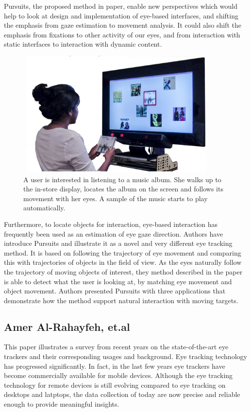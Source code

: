 Pursuits, the proposed method in paper, enable new perspectives which would help to look at design and implementation of eye-based interfaces, and shifting the emphasis from gaze estimation to movement analysis. It could also shift the emphasis from fixations to other activity of our eyes, and from interaction with static interfaces to interaction with dynamic content.\\

\begin{figure}[!hbt]
  \centering
  \includegraphics[width=4in,height=2.5in]{melodie2.png}
  \caption{A user is interested in listening to a music album. She walks up to the in-store display, locates the album on the screen and follows its movement with her eyes. A sample of the music starts to play automatically.}
  \label{melodie2}
\end{figure}

Furthermore, to locate objects for interaction, eye-based interaction has frequently been used as an estimation of eye gaze direction. Authors have introduce Pursuits and illustrate it as a novel and very different eye tracking method. It is based on following the trajectory of eye movement and comparing this with trajectories of objects in the field of view. As the eyes naturally follow the trajectory of moving objects of interest, they method described in the paper is able to detect what the user is looking at, by matching eye movement and object movement. Authors presented Pursuits with three applications that demonstrate how the method support natural interaction with moving targets.


\subsection{Amer Al-Rahayfeh, et.al \cite{3}}

This paper illustrates a survey from recent years on the state-of-the-art eye trackers and their corresponding usages and background. Eye tracking technology has progressed significantly. In fact, in the last few years eye trackers have become commercially available for mobile devices. Although the eye tracking technology for remote devices is still evolving compared to eye tracking on desktops and latptops, the data collection of today are now precise and reliable enough to provide meaningful insights.

